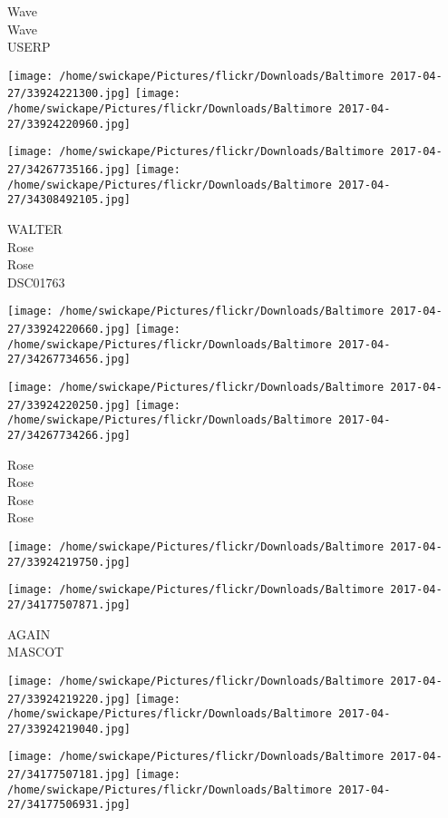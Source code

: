 \documentclass[10pt,letterpaper]{article}
\begin{document}
Wave\\
Wave\\
USERP\\
\pagebreak

\texttt{[image: /home/swickape/Pictures/flickr/Downloads/Baltimore 2017-04-27/33924221300.jpg]}
\texttt{[image: /home/swickape/Pictures/flickr/Downloads/Baltimore 2017-04-27/33924220960.jpg]}

\texttt{[image: /home/swickape/Pictures/flickr/Downloads/Baltimore 2017-04-27/34267735166.jpg]}
\texttt{[image: /home/swickape/Pictures/flickr/Downloads/Baltimore 2017-04-27/34308492105.jpg]}

WALTER\\
Rose\\
Rose\\
DSC01763\\
\pagebreak

\texttt{[image: /home/swickape/Pictures/flickr/Downloads/Baltimore 2017-04-27/33924220660.jpg]}
\texttt{[image: /home/swickape/Pictures/flickr/Downloads/Baltimore 2017-04-27/34267734656.jpg]}

\texttt{[image: /home/swickape/Pictures/flickr/Downloads/Baltimore 2017-04-27/33924220250.jpg]}
\texttt{[image: /home/swickape/Pictures/flickr/Downloads/Baltimore 2017-04-27/34267734266.jpg]}

Rose\\
Rose\\
Rose\\
Rose\\
\pagebreak

\texttt{[image: /home/swickape/Pictures/flickr/Downloads/Baltimore 2017-04-27/33924219750.jpg]}

\vspace{0.25in}
\texttt{[image: /home/swickape/Pictures/flickr/Downloads/Baltimore 2017-04-27/34177507871.jpg]}

AGAIN\\
MASCOT\\
\pagebreak

\texttt{[image: /home/swickape/Pictures/flickr/Downloads/Baltimore 2017-04-27/33924219220.jpg]}
\texttt{[image: /home/swickape/Pictures/flickr/Downloads/Baltimore 2017-04-27/33924219040.jpg]}

\texttt{[image: /home/swickape/Pictures/flickr/Downloads/Baltimore 2017-04-27/34177507181.jpg]}
\texttt{[image: /home/swickape/Pictures/flickr/Downloads/Baltimore 2017-04-27/34177506931.jpg]}
\end{document}
